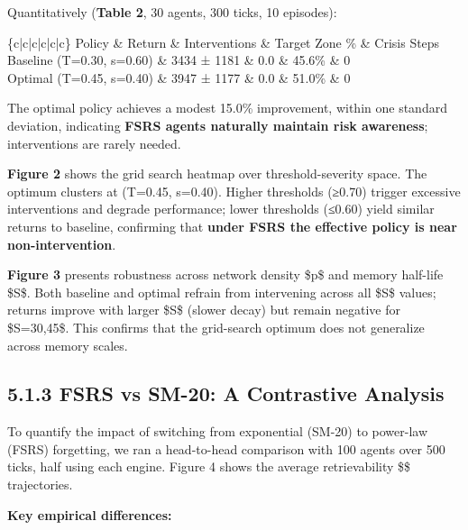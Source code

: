 \documentclass[11pt]{article}
\begin{document}
{{Quantitatively (\textbf{Table 2}, 30 agents, 300 ticks, 10 episodes):

\begin{table}[ht]
\centering
\begin{tabular}\{c|c|c|c|c|c\}
\toprule
Policy \& Return \& Interventions \& Target Zone \% \& Crisis Steps \\
\midrule
Baseline (T=0.30, s=0.60) \& 3434 ± 1181 \& 0.0 \& 45.6\% \& 0 \\
Optimal (T=0.45, s=0.40) \& 3947 ± 1177 \& 0.0 \& 51.0\% \& 0 \\
\bottomrule
\end{tabular}
\end{table}
The optimal policy achieves a modest 15.0\% improvement, within one standard deviation, indicating \textbf{FSRS agents naturally maintain risk awareness}; interventions are rarely needed.

\textbf{Figure 2} shows the grid search heatmap over threshold-severity space. The optimum clusters at (T=0.45, s=0.40). Higher thresholds (≥0.70) trigger excessive interventions and degrade performance; lower thresholds (≤0.60) yield similar returns to baseline, confirming that \textbf{under FSRS the effective policy is near non-intervention}.

\textbf{Figure 3} presents robustness across network density \$p\$ and memory half-life \$S\$. Both baseline and optimal refrain from intervening across all \$S\$ values; returns improve with larger \$S\$ (slower decay) but remain negative for \$S=30,45\$. This confirms that the grid-search optimum does not generalize across memory scales.

\subsection{5.1.3 FSRS vs SM-20: A Contrastive Analysis}

To quantify the impact of switching from exponential (SM-20) to power-law (FSRS) forgetting, we ran a head-to-head comparison with 100 agents over 500 ticks, half using each engine. Figure 4 shows the average retrievability \$\$ trajectories.

\textbf{Key empirical differences:}

}}
\end{document}
